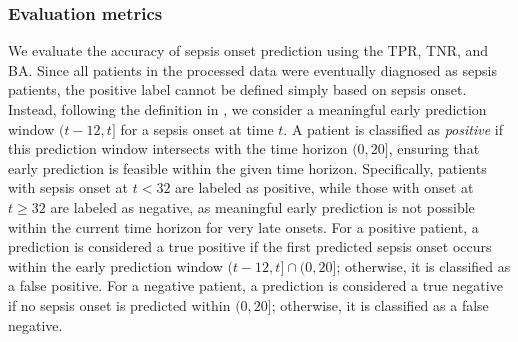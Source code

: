 \documentclass[11pt]{article}
\theoremstyle{remark}
\theoremstyle{plain}
\begin{document}
\subsubsection{Evaluation metrics}\label{apdx:eva-sepsis}

We evaluate the accuracy of sepsis onset prediction using the TPR, TNR, and BA. Since all patients in the processed data were eventually diagnosed as sepsis patients, the positive label cannot be defined simply based on sepsis onset. Instead, following the definition in \cite{physionetChallenge}, we consider a meaningful early prediction window \((t-12, t]\) for a sepsis onset at time \(t\). A patient is classified as {\it positive} if this prediction window intersects with the time horizon \((0, 20]\), ensuring that early prediction is feasible within the given time horizon.  
%
Specifically, patients with sepsis onset at \(t < 32\) are labeled as positive, while those with onset at \(t \geq 32\) are labeled as negative, as meaningful early prediction is not possible within the current time horizon for very late onsets.  
%
For a positive patient, a prediction is considered a true positive if the first predicted sepsis onset occurs within the early prediction window \((t-12, t] \cap (0, 20]\); otherwise, it is classified as a false positive.  
%
For a negative patient, a prediction is considered a true negative if no sepsis onset is predicted within \((0, 20]\); otherwise, it is classified as a false negative.
\end{document}
